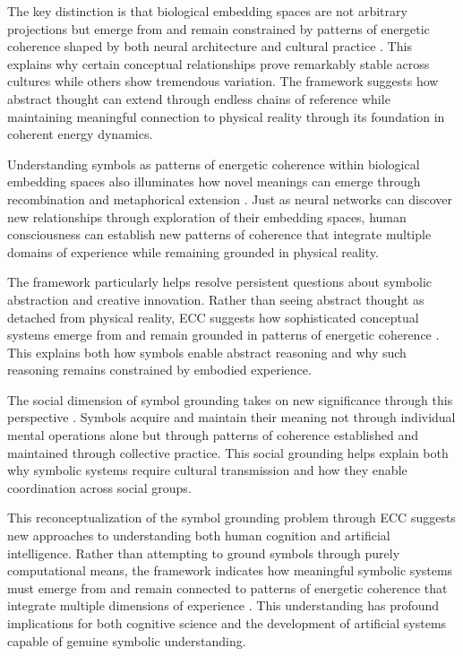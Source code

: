 The key distinction is that biological embedding spaces are not arbitrary projections but emerge from and remain constrained by patterns of energetic coherence shaped by both neural architecture and cultural practice \cite{varela1991embodied}. This explains why certain conceptual relationships prove remarkably stable across cultures while others show tremendous variation. The framework suggests how abstract thought can extend through endless chains of reference while maintaining meaningful connection to physical reality through its foundation in coherent energy dynamics.

Understanding symbols as patterns of energetic coherence within biological embedding spaces also illuminates how novel meanings can emerge through recombination and metaphorical extension \cite{lakoff1999philosophy}. Just as neural networks can discover new relationships through exploration of their embedding spaces, human consciousness can establish new patterns of coherence that integrate multiple domains of experience while remaining grounded in physical reality.

The framework particularly helps resolve persistent questions about symbolic abstraction and creative innovation. Rather than seeing abstract thought as detached from physical reality, ECC suggests how sophisticated conceptual systems emerge from and remain grounded in patterns of energetic coherence \cite{barsalou1999perceptual}. This explains both how symbols enable abstract reasoning and why such reasoning remains constrained by embodied experience.

The social dimension of symbol grounding takes on new significance through this perspective \cite{hutchins1995cognition}. Symbols acquire and maintain their meaning not through individual mental operations alone but through patterns of coherence established and maintained through collective practice. This social grounding helps explain both why symbolic systems require cultural transmission and how they enable coordination across social groups.

This reconceptualization of the symbol grounding problem through ECC suggests new approaches to understanding both human cognition and artificial intelligence. Rather than attempting to ground symbols through purely computational means, the framework indicates how meaningful symbolic systems must emerge from and remain connected to patterns of energetic coherence that integrate multiple dimensions of experience \cite{harnad1990symbol}. This understanding has profound implications for both cognitive science and the development of artificial systems capable of genuine symbolic understanding.